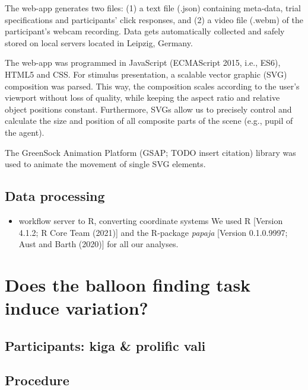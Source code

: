 \documentclass[
  english,
  man,floatsintext]{apa6}
\providecommand{\tightlist}{%
  \setlength{\itemsep}{0pt}\setlength{\parskip}{0pt}}
\begin{document}
The web-app generates two files: (1) a text file (.json) containing meta-data, trial specifications and participants' click responses, and (2) a video file (.webm) of the participant's webcam recording. Data gets automatically collected and safely stored on local servers located in Leipzig, Germany.

The web-app was programmed in JavaScript (ECMAScript 2015, i.e., ES6), HTML5 and CSS. For stimulus presentation, a scalable vector graphic (SVG) composition was parsed. This way, the composition scales according to the user's viewport without loss of quality, while keeping the aspect ratio and relative object positions constant. Furthermore, SVGs allow us to precisely control and calculate the size and position of all composite parts of the scene (e.g., pupil of the agent).

The GreenSock Animation Platform (GSAP; TODO insert citation) library was used to animate the movement of single SVG elements.

\hypertarget{data-processing-1}{%
\subsection{Data processing}\label{data-processing-1}}

\begin{itemize}
\tightlist
\item
  workflow server to R, converting coordinate systems
  We used R {[}Version 4.1.2; R Core Team (2021){]} and the R-package \emph{papaja} {[}Version 0.1.0.9997; Aust and Barth (2020){]} for all our analyses.
\end{itemize}

\hypertarget{does-the-balloon-finding-task-induce-variation}{%
\section{Does the balloon finding task induce variation?}\label{does-the-balloon-finding-task-induce-variation}}

\hypertarget{participants-kiga-prolific-vali-1}{%
\subsection{Participants: kiga \& prolific vali}\label{participants-kiga-prolific-vali-1}}

\hypertarget{procedure-1}{%
\subsection{Procedure}\label{procedure-1}}
\end{document}
